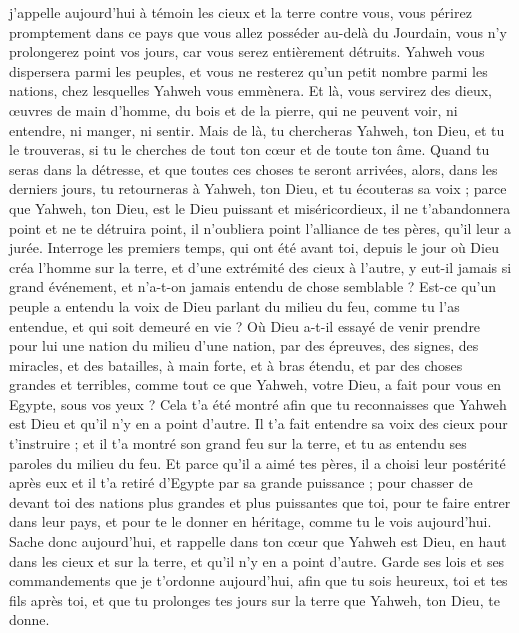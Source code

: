 \begin{multicols}{2}
j'appelle aujourd'hui à témoin les cieux et la terre contre vous, vous périrez promptement dans ce pays que vous allez posséder au-delà du Jourdain, vous n'y prolongerez point vos jours, car vous serez entièrement détruits.
Yahweh vous dispersera parmi les peuples, et vous ne resterez qu'un petit nombre parmi les nations, chez lesquelles Yahweh vous emmènera.
Et là, vous servirez des dieux, œuvres de main d'homme, du bois et de la pierre, qui ne peuvent voir, ni entendre, ni manger, ni sentir.
Mais de là, tu chercheras Yahweh, ton Dieu, et tu le trouveras, si tu le cherches de tout ton cœur et de toute ton âme.
Quand tu seras dans la détresse, et que toutes ces choses te seront arrivées, alors, dans les derniers jours, tu retourneras à Yahweh, ton Dieu, et tu écouteras sa voix ;
parce que Yahweh, ton Dieu, est le Dieu puissant et miséricordieux, il ne t'abandonnera point et ne te détruira point, il n'oubliera point l'alliance de tes pères, qu'il leur a jurée.
Interroge les premiers temps, qui ont été avant toi, depuis le jour où Dieu créa l'homme sur la terre, et d’une extrémité des cieux à l’autre, y eut-il jamais si grand événement, et n’a-t-on jamais entendu de chose semblable ?
Est-ce qu’un peuple a entendu la voix de Dieu parlant du milieu du feu, comme tu l'as entendue, et qui soit demeuré en vie ?
Où Dieu a-t-il essayé de venir prendre pour lui une nation du milieu d'une nation, par des épreuves, des signes, des miracles, et des batailles, à main forte, et à bras étendu, et par des choses grandes et terribles, comme tout ce que Yahweh, votre Dieu, a fait pour vous en Egypte, sous vos yeux ?
Cela t’a été montré afin que tu reconnaisses que Yahweh est Dieu et qu'il n'y en a point d'autre.
Il t'a fait entendre sa voix des cieux pour t'instruire ; et il t'a montré son grand feu sur la terre, et tu as entendu ses paroles du milieu du feu.
Et parce qu'il a aimé tes pères, il a choisi leur postérité après eux et il t'a retiré d'Egypte par sa grande puissance ;
pour chasser de devant toi des nations plus grandes et plus puissantes que toi, pour te faire entrer dans leur pays, et pour te le donner en héritage, comme tu le vois aujourd'hui.
Sache donc aujourd'hui, et rappelle dans ton cœur que Yahweh est Dieu, en haut dans les cieux et sur la terre, et qu'il n'y en a point d'autre.
Garde ses lois et ses commandements que je t’ordonne aujourd'hui, afin que tu sois heureux, toi et tes fils après toi, et que tu prolonges tes jours sur la terre que Yahweh, ton Dieu, te donne.

\end{multicols}
